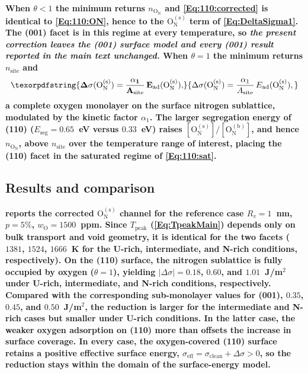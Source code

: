 \documentclass[preprint,12pt,sort&compress]{elsarticle}
\newcommand{\?}{\stackrel{?}{=}}
\providecommand{\DIFaddtex}[1]{{\bf #1}} %
\providecommand{\DIFadd}[1]{\texorpdfstring{\DIFaddtex{#1}}{#1}} %
\begin{document}
\DIFadd{When $\theta < 1$ the minimum returns $n_{\text{O}_\text{N}}$ and \cref{Eq:110:corrected} is identical to \cref{Eq:110:ON}, hence to the $\text{O}_\text{N}^{(\text{s})}$ term of \cref{Eq:DeltaSigma1}. The (001) facet is in this regime at every temperature, so \emph{the present correction leaves the (001) surface model and every (001) result reported in the main text unchanged.} When $\theta=1$ the minimum returns $n_\text{site}$ and
}\begin{equation}
\DIFadd{\Delta \sigma(\text{O}_\text{N}^{(\text{s})}) = \frac{\alpha_1}{A_\text{site}} \, E_\text{ad}(\text{O}_\text{N}^{(\text{s})}),
\label{Eq:110:sat}
}\end{equation}
\DIFadd{a complete oxygen monolayer on the surface nitrogen sublattice, modulated by the kinetic factor $\alpha_1$. The larger segregation energy of (110) ($E_\text{seg}=0.65$~eV versus $0.33$~eV) raises $[\text{O}_\text{N}^{(\text{s})}]/[\text{O}_\text{N}^{(\text{b})}]$, and hence $n_{\text{O}_\text{N}}$, above $n_\text{site}$ over the temperature range of interest, placing the (110) facet in the saturated regime of \cref{Eq:110:sat}.
}

\subsection{\DIFadd{Results and comparison}}
\label{App:110:results}

\DIFadd{ reports the corrected $\text{O}_\text{N}^{(\text{s})}$ channel for the reference case $R_v=1$~nm, $p=5\%$, $w_\text{O}=1500$~ppm. Since $T_\text{peak}$ (\cref{Eq:TpeakMain}) depends only on bulk transport and void geometry, it is identical for the two facets ($1381$, $1524$, $1666$~K for the U-rich, intermediate, and N-rich conditions, respectively). On the (110) surface, the nitrogen sublattice is fully occupied by oxygen ($\theta=1$), yielding $|\Delta\sigma|=0.18$, $0.60$, and $1.01$~J/m$^2$ under U-rich, intermediate, and N-rich conditions, respectively. Compared with the corresponding sub-monolayer values for (001), $0.35$, $0.45$, and
$0.50$~J/m$^2$, the reduction is larger for the intermediate and N-rich cases but smaller under U-rich conditions. In the latter case, the weaker oxygen adsorption on (110) more than offsets the increase in surface coverage. In every case, the oxygen-covered (110) surface retains a positive effective surface energy, $\sigma_\text{eff}=\sigma_\text{clean}+\Delta\sigma>0$, so the reduction stays within the domain of the surface-energy model.
}
\end{document}
